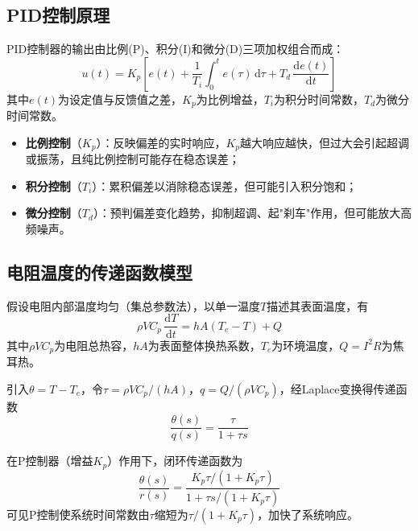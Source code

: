 \documentclass[a4paper,8pt,twocolumn]{article}
\begin{document}
\subsection{PID控制原理}

PID控制器的输出由比例(P)、积分(I)和微分(D)三项加权组合而成：
\begin{equation}
  u(t)=K_p\!\left[e(t)+\frac{1}{T_i}\int_0^t e(\tau)\,\mathrm{d}\tau
       +T_d\,\frac{\mathrm{d}e(t)}{\mathrm{d}t}\right]
  \tag{RX2.1}
\end{equation}
其中$e(t)$为设定值与反馈值之差，$K_p$为比例增益，$T_i$为积分时间常数，$T_d$为微分时间常数。

\begin{itemize}
  \item \textbf{比例控制}（$K_p$）：反映偏差的实时响应，$K_p$越大响应越快，但过大会引起超调或振荡，且纯比例控制可能存在稳态误差；
  \item \textbf{积分控制}（$T_i$）：累积偏差以消除稳态误差，但可能引入积分饱和；
  \item \textbf{微分控制}（$T_d$）：预判偏差变化趋势，抑制超调、起"刹车"作用，但可能放大高频噪声。
\end{itemize}

\subsection{电阻温度的传递函数模型}

假设电阻内部温度均匀（集总参数法），以单一温度$T$描述其表面温度，有
\begin{equation}
  \rho V C_p\,\frac{\mathrm{d}T}{\mathrm{d}t}
    =hA(T_e-T)+Q
  \tag{RX2.2}
\end{equation}
其中$\rho V C_p$为电阻总热容，$hA$为表面整体换热系数，$T_e$为环境温度，$Q=I^2R$为焦耳热。

引入$\theta=T-T_e$，令$\tau=\rho V C_p/(hA)$，$q=Q/(\rho V C_p)$，经Laplace变换得传递函数
\begin{equation}
  \frac{\theta(s)}{q(s)}=\frac{\tau}{1+\tau s}
  \tag{RX2.3}
\end{equation}

在P控制器（增益$K_p$）作用下，闭环传递函数为
\begin{equation}
  \frac{\theta(s)}{r(s)}=\frac{K_p\tau/(1+K_p\tau)}{1+\tau s/(1+K_p\tau)}
  \tag{RX2.4}
\end{equation}
可见P控制使系统时间常数由$\tau$缩短为$\tau/(1+K_p\tau)$，加快了系统响应。

\end{document}
